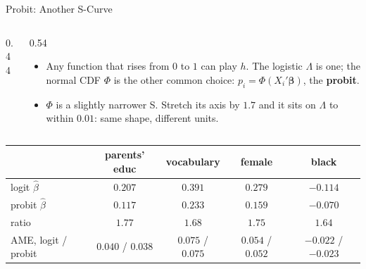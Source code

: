 \documentclass[aspectratio=169,11pt,xcolor=dvipsnames]{beamer}
\newcommand{\core}{\,\raisebox{0.6pt}{\textcolor{corestar}{$\bigstar$}}}
\begin{document}
\begin{frame}{Probit: Another S-Curve\core}
\begin{columns}[c]
\begin{column}{0.44\textwidth}
\centering
{}
\end{column}
\begin{column}{0.54\textwidth}
\begin{itemize}\itemsep3pt
  \item Any function that rises from $0$ to $1$ can play $h$. The
        logistic $\Lambda$ is one; the normal CDF $\Phi$ is the other
        common choice: $p_i = \Phi(X_i'\bm\beta)$, the \textbf{probit}.
  \item $\Phi$ is a slightly narrower S. Stretch its axis by $1.7$ and it
        sits on $\Lambda$ to within $0.01$: same shape, different units.
\end{itemize}
\end{column}
\end{columns}
\begin{center}\small
\renewcommand{\arraystretch}{1.0}
\begin{tabular}{lcccc}
\toprule
 & parents' educ & vocabulary & female & black \\
\midrule
logit $\hat\beta$  & $0.207$ & $0.391$ & $0.279$ & $-0.114$ \\
probit $\hat\beta$ & $0.117$ & $0.233$ & $0.159$ & $-0.070$ \\
ratio & $1.77$ & $1.68$ & $1.75$ & $1.64$ \\
AME, logit / probit & $0.040$ / $0.038$ & $0.075$ / $0.075$ & $0.054$ / $0.052$ & $-0.022$ / $-0.023$ \\
\bottomrule
\end{tabular}
\end{center}
\end{frame}
\end{document}
